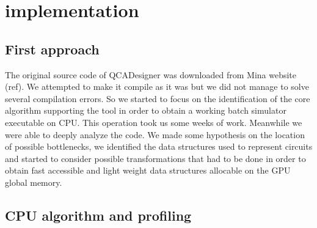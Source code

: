 \chapter{implementation}\label{sec:implementation}
\section{First approach}
The original source code of QCADesigner was downloaded from Mina website (ref). We attempted to make it compile as it was but we did not manage to solve several compilation errors. So we started to focus on the identification of the core algorithm supporting the tool in order to obtain a working batch simulator executable on CPU. This operation took us some weeks of work. Meanwhile we were able to deeply analyze the code. We made some hypothesis on the location of possible bottlenecks, we identified the data structures used to represent circuits and started to consider possible transformations that had to be done in order to obtain fast accessible and light weight data structures allocable on the GPU global memory.

\section{CPU algorithm and profiling}